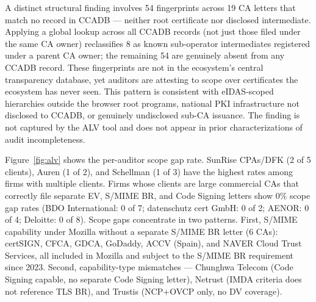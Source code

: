\documentclass[10pt,twocolumn,letterpaper]{article}
\begin{document}
A distinct structural finding involves 54 fingerprints across
19 CA letters that match no record in CCADB --- neither root certificate
nor disclosed intermediate. Applying a global lookup across all CCADB
records (not just those filed under the same CA owner) reclassifies 8
as known sub-operator intermediates registered under a parent CA owner;
the remaining 54 are genuinely absent from any CCADB record. These
fingerprints are not in the ecosystem's central transparency database,
yet auditors are attesting to scope over certificates the ecosystem
has never seen. This pattern is consistent with eIDAS-scoped hierarchies
outside the browser root programs, national PKI infrastructure not
disclosed to CCADB, or genuinely undisclosed sub-CA issuance. The
finding is not captured by the ALV tool and does not appear in prior
characterizations of audit incompleteness.

Figure~\ref{fig:alv} shows the per-auditor scope gap rate.
SunRise CPAs/DFK (2 of 5 clients), Auren (1 of 2), and Schellman (1 of 3)
have the highest rates among firms with multiple clients. Firms whose clients are large
commercial CAs that correctly file separate EV, S/MIME BR, and Code
Signing letters show 0\% scope gap rates (BDO International: 0 of 7;
datenschutz cert GmbH: 0 of 2; AENOR: 0 of 4; Deloitte: 0 of 8). Scope gaps concentrate
in two patterns. First, S/MIME capability under Mozilla without a separate S/MIME BR
letter (6 CAs): certSIGN, CFCA, GDCA, GoDaddy, ACCV (Spain), and NAVER Cloud Trust Services,
all included in Mozilla and subject to the S/MIME BR requirement since 2023. Second,
capability-type mismatches --- Chunghwa Telecom
(Code Signing capable, no separate Code Signing letter), Netrust
(IMDA criteria does not reference TLS BR), and Trustis (NCP+OVCP only,
no DV coverage).
\end{document}

